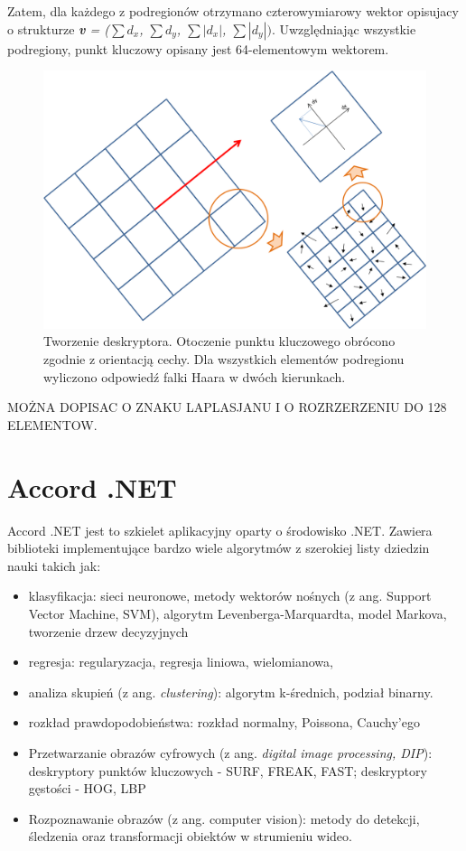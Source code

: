 Zatem, dla każdego z podregionów otrzymano czterowymiarowy wektor opisujacy o strukturze \textit{\textbf{v} = ($\sum$$d_x$, $\sum$$d_y$, $\sum$$|d_x|$, $\sum$$|d_y|)$}. Uwzględniając wszystkie podregiony, punkt kluczowy opisany jest 64-elementowym wektorem. 

 \begin{figure}[h]
	\includegraphics[width=16cm]{Description}
	\centering
	\caption{Tworzenie deskryptora. Otoczenie punktu kluczowego obrócono zgodnie z orientacją cechy. Dla wszystkich elementów podregionu wyliczono odpowiedź falki Haara w dwóch kierunkach.}
	\label{im: Description}
\end{figure}

MOŻNA DOPISAC O ZNAKU LAPLASJANU I O ROZRZERZENIU DO 128 ELEMENTOW.

\section{Accord .NET}
Accord .NET jest to szkielet aplikacyjny oparty o środowisko .NET. Zawiera biblioteki implementujące bardzo wiele algorytmów z szerokiej listy dziedzin nauki takich jak:

\begin{itemize}
	\item klasyfikacja: sieci neuronowe, metody wektorów nośnych (z ang. Support Vector Machine, SVM), algorytm Levenberga-Marquardta, model Markova, tworzenie drzew decyzyjnych
	\item regresja: regularyzacja, regresja liniowa, wielomianowa, 
	\item analiza skupień (z ang. \textit{clustering}): algorytm k-średnich, podział binarny. 
	\item rozkład prawdopodobieństwa: rozkład normalny, Poissona, Cauchy'ego
	\item Przetwarzanie obrazów cyfrowych (z ang. \textit{digital image processing, DIP}): deskryptory punktów kluczowych - SURF, FREAK, FAST; deskryptory gęstości - HOG, LBP
	\item Rozpoznawanie obrazów (z ang. computer vision): metody do detekcji, śledzenia oraz transformacji obiektów w strumieniu wideo. 
\end{itemize}

